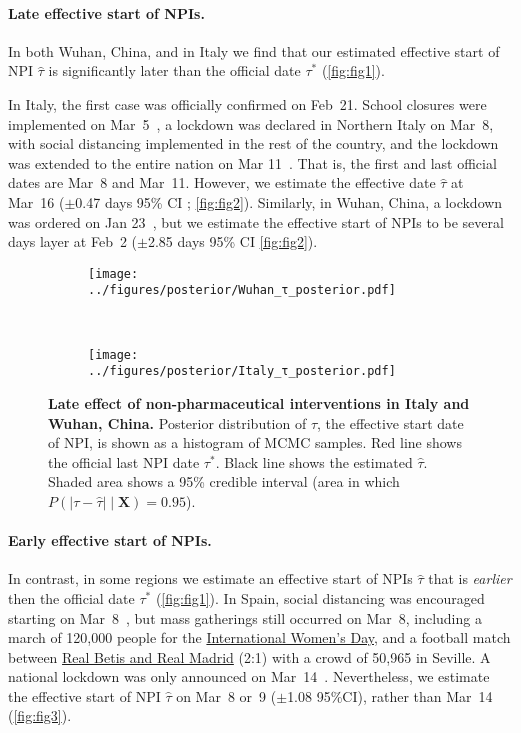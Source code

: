 \documentclass[12pt]{extarticle}
\let\vec\mathbf
\begin{document}
\paragraph*{Late effective start of NPIs.}
In both Wuhan, China, and in Italy we find that our estimated effective start of NPI $\hat{\tau}$ is significantly later than the official date $\tau^*$ (\autoref{fig:fig1}). 

In Italy, the first case was officially confirmed on Feb~21. School closures were implemented on Mar~5~\citep{Flaxman2020}, a lockdown was declared in Northern Italy on Mar~8, with social distancing implemented in the rest of the country, and the lockdown was extended to the entire nation on Mar 11~\citep{Gatto2020}.
That is, the first and last official dates are Mar~8 and Mar~11.
However, we estimate the effective date $\hat{\tau}$ at Mar~16 ($\pm$0.47 days 95\% CI ; \autoref{fig:fig2}).
Similarly, in Wuhan, China, a lockdown was ordered on Jan 23~\citep{Li2020}, but we estimate the effective start of NPIs to be several days layer at Feb~2 ($\pm$2.85 days 95\% CI \autoref{fig:fig2}).


\begin{figure}[h]
    \centering
    \begin{subfigure}{0.45\textwidth}
        \texttt{[image: ../figures/posterior/Wuhan\_τ\_posterior.pdf]}
    \end{subfigure}
  	~
    \begin{subfigure}{0.45\textwidth}
        \texttt{[image: ../figures/posterior/Italy\_τ\_posterior.pdf]}
    \end{subfigure}
    \caption{
	\textbf{Late effect of non-pharmaceutical interventions in Italy and Wuhan, China.}
    Posterior distribution of $\tau$, the effective start date of NPI, is shown as a histogram of MCMC samples. Red line shows the official last NPI date $\tau^*$. Black line shows the estimated $\hat{\tau}$. Shaded area shows a 95\% credible interval (area in which $P(|\tau - \hat{\tau}| \mid \vec{X}) = 0.95$). 
    }
    \label{fig:fig2}
\end{figure}



\paragraph*{Early effective start of NPIs.}
In contrast, in some regions we estimate an effective start of NPIs $\hat{\tau}$ that is \emph{earlier} then the official date $\tau^*$ (\autoref{fig:fig1}).
In Spain, social distancing was encouraged starting on Mar~8~\citep{Flaxman2020}, but mass gatherings still occurred on Mar~8, including a march of 120,000 people for the \href{https://www.nytimes.com/2020/03/13/world/europe/spain-coronavirus-emergency.html}{International Women's Day}, and a  football match between \href{https://www.espn.com/soccer/match?gameId=550350}{Real Betis and Real Madrid} (2:1) with a crowd of 50,965 in Seville.
A national lockdown was only announced on Mar~14~\citep{Flaxman2020}.
Nevertheless, we estimate the effective start of NPI $\hat{\tau}$ on Mar~8 or~9 ($\pm$1.08 95\%CI), rather than Mar~14 (\autoref{fig:fig3}).
\end{document}
